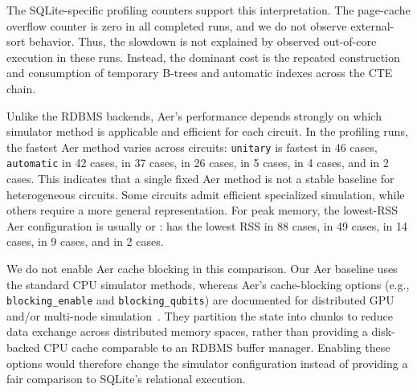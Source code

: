The SQLite-specific profiling counters support this interpretation. The
page-cache overflow counter is zero in all completed runs, and we do not observe
external-sort behavior. Thus, the slowdown is not explained by observed
out-of-core execution in these runs. Instead, the dominant cost is the repeated
construction and consumption of temporary B-trees and automatic indexes across
the CTE chain.

Unlike the RDBMS backends, Aer's performance depends strongly on which simulator
method is applicable and efficient for each circuit. In the profiling runs, the
fastest  Aer method varies across circuits: \texttt{unitary} is fastest
in 46 cases, \texttt{automatic} in 42 cases,  in 37 cases,
 in 26 cases,  in
5 cases,  in 4 cases, and  in 2
cases. This indicates that a single fixed Aer method is not a stable baseline for
heterogeneous circuits. Some circuits admit efficient specialized simulation,
while others require a more general representation. For peak memory, the
lowest-RSS Aer configuration is usually  or
:   has the lowest RSS in 88 cases,
 in 49 cases,  in 14 cases,
 in 9 cases, and  in 2 cases.

We do not enable Aer cache blocking in this comparison. Our Aer baseline uses the
standard CPU simulator methods, whereas Aer's cache-blocking options (e.g.,
\texttt{blocking\_enable} and \texttt{blocking\_qubits}) are documented for
distributed GPU and/or multi-node simulation~\cite{QiskitAerMultiGPU}. They
partition the state into chunks to reduce data exchange across distributed memory
spaces, rather than providing a disk-backed CPU cache comparable to an RDBMS
buffer manager. Enabling these options would therefore change the simulator
configuration instead of providing a fair comparison to SQLite's
relational execution.  

\medskip
  \vspace{0.2cm}
\noindent
\setlength{\fboxsep}{6pt}
